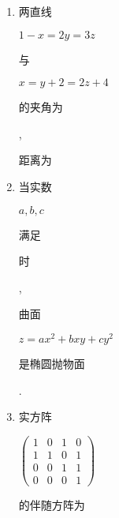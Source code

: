 \documentclass[10pt]{article}
\begin{document}
\begin{enumerate}
  \item \begin{CJK}{UTF8}{mj}两直线\end{CJK} $1-x=2 y=3 z$ \begin{CJK}{UTF8}{mj}与\end{CJK} $x=y+2=2 z+4$ \begin{CJK}{UTF8}{mj}的夹角为\end{CJK} , \begin{CJK}{UTF8}{mj}距离为\end{CJK}

  \item \begin{CJK}{UTF8}{mj}当实数\end{CJK} $a, b, c$ \begin{CJK}{UTF8}{mj}满足\end{CJK} \begin{CJK}{UTF8}{mj}时\end{CJK}, \begin{CJK}{UTF8}{mj}曲面\end{CJK} $z=a x^{2}+b x y+c y^{2}$ \begin{CJK}{UTF8}{mj}是椭圆抛物面\end{CJK}.

  \item \begin{CJK}{UTF8}{mj}实方阵\end{CJK} $\left(\begin{array}{llll}1 & 0 & 1 & 0 \\ 1 & 1 & 0 & 1 \\ 0 & 0 & 1 & 1 \\ 0 & 0 & 0 & 1\end{array}\right)$ \begin{CJK}{UTF8}{mj}的伴随方阵为\end{CJK}


\end{enumerate}
\end{document}
